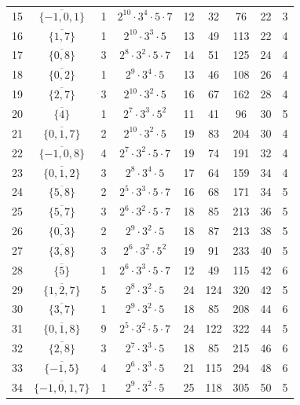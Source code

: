\documentclass[a4paper,11pt]{article}
\begin{document}
\begin{table}
\begin{center}
{\begin{tabular}{|c|c|c|c|c|c|c|c|c|}
15 & $\overline{\{-1,0,1\}}$ & 1 & $2^{10} \cdot 3^{4} \cdot 5 \cdot 7$ & 12 & 32 & 76 & 22 & 3\\
16 & $\overline{\{1,7\}}$ & 1 & $2^{10} \cdot 3^{3} \cdot 5$ & 13 & 49 & 113 & 22 & 4\\
17 & $\overline{\{0,8\}}$ & 3 & $2^{8} \cdot 3^{2} \cdot 5 \cdot 7$ & 14 & 51 & 125 & 24 & 4\\
18 & $\overline{\{0,2\}}$ & 1 & $2^{9} \cdot 3^{4} \cdot 5$ & 13 & 46 & 108 & 26 & 4\\
19 & $\overline{\{2,7\}}$ & 3 & $2^{10} \cdot 3^{2} \cdot 5$ & 16 & 67 & 162 & 28 & 4\\
20 & $\overline{\{4\}}$ & 1 & $2^{7} \cdot 3^{3} \cdot 5^{2}$ & 11 & 41 & 96 & 30 & 5\\
21 & $\overline{\{0,1,7\}}$ & 2 & $2^{10} \cdot 3^{2} \cdot 5$ & 19 & 83 & 204 & 30 & 4\\
22 & $\overline{\{-1,0,8\}}$ & 4 & $2^{7} \cdot 3^{2} \cdot 5 \cdot 7$ & 19 & 74 & 191 & 32 & 4\\
23 & $\overline{\{0,1,2\}}$ & 3 & $2^{8} \cdot 3^{4} \cdot 5$ & 17 & 64 & 159 & 34 & 4\\
24 & $\overline{\{5,8\}}$ & 2 & $2^{5} \cdot 3^{3} \cdot 5 \cdot 7$ & 16 & 68 & 171 & 34 & 5\\
25 & $\overline{\{5,7\}}$ & 3 & $2^{6} \cdot 3^{2} \cdot 5 \cdot 7$ & 18 & 85 & 213 & 36 & 5\\
26 & $\overline{\{0,3\}}$ & 2 & $2^{9} \cdot 3^{2} \cdot 5$ & 18 & 87 & 213 & 38 & 5\\
27 & $\overline{\{3,8\}}$ & 3 & $2^{6} \cdot 3^{2} \cdot 5^{2}$ & 19 & 91 & 233 & 40 & 5\\
28 & $\overline{\{5\}}$ & 1 & $2^{6} \cdot 3^{3} \cdot 5 \cdot 7$ & 12 & 49 & 115 & 42 & 6\\
29 & $\overline{\{1,2,7\}}$ & 5 & $2^{8} \cdot 3^{2} \cdot 5$ & 24 & 124 & 320 & 42 & 5\\
30 & $\overline{\{3,7\}}$ & 1 & $2^{9} \cdot 3^{2} \cdot 5$ & 18 & 85 & 208 & 44 & 6\\
31 & $\overline{\{0,1,8\}}$ & 9 & $2^{5} \cdot 3^{2} \cdot 5 \cdot 7$ & 24 & 122 & 322 & 44 & 5\\
32 & $\overline{\{2,8\}}$ & 3 & $2^{7} \cdot 3^{3} \cdot 5$ & 18 & 85 & 215 & 46 & 6\\
33 & $\overline{\{-1,5\}}$ & 4 & $2^{6} \cdot 3^{3} \cdot 5$ & 21 & 115 & 294 & 48 & 6\\
34 & $\overline{\{-1,0,1,7\}}$ & 1 & $2^{9} \cdot 3^{2} \cdot 5$ & 25 & 118 & 305 & 50 & 5\\

\end{tabular}}
\end{center}
\end{table}
\end{document}
